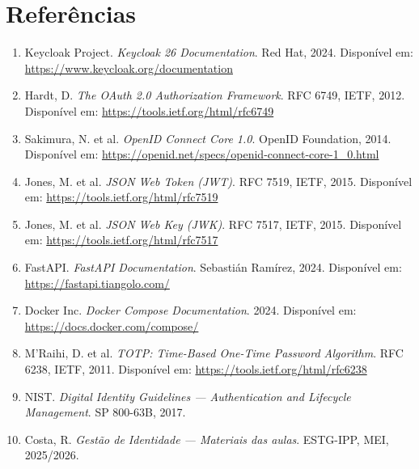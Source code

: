 \documentclass[12pt,a4paper]{article}
\begin{document}
\newpage
\section*{Referências}

\begin{enumerate}[leftmargin=1.5cm]

  \item Keycloak Project. \textit{Keycloak 26 Documentation}. Red Hat, 2024. Disponível em: \url{https://www.keycloak.org/documentation}

  \item Hardt, D. \textit{The OAuth 2.0 Authorization Framework}. RFC 6749, IETF, 2012. Disponível em: \url{https://tools.ietf.org/html/rfc6749}

  \item Sakimura, N. et al. \textit{OpenID Connect Core 1.0}. OpenID Foundation, 2014. Disponível em: \url{https://openid.net/specs/openid-connect-core-1_0.html}

  \item Jones, M. et al. \textit{JSON Web Token (JWT)}. RFC 7519, IETF, 2015. Disponível em: \url{https://tools.ietf.org/html/rfc7519}

  \item Jones, M. et al. \textit{JSON Web Key (JWK)}. RFC 7517, IETF, 2015. Disponível em: \url{https://tools.ietf.org/html/rfc7517}

  \item FastAPI. \textit{FastAPI Documentation}. Sebastián Ramírez, 2024. Disponível em: \url{https://fastapi.tiangolo.com/}

  \item Docker Inc. \textit{Docker Compose Documentation}. 2024. Disponível em: \url{https://docs.docker.com/compose/}

  \item M'Raihi, D. et al. \textit{TOTP: Time-Based One-Time Password Algorithm}. RFC 6238, IETF, 2011. Disponível em: \url{https://tools.ietf.org/html/rfc6238}

  \item NIST. \textit{Digital Identity Guidelines — Authentication and Lifecycle Management}. SP 800-63B, 2017.

  \item Costa, R. \textit{Gestão de Identidade — Materiais das aulas}. ESTG-IPP, MEI, 2025/2026.

\end{enumerate}
\end{document}
